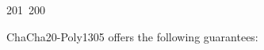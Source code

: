 201~200~\documentclass{article}
\begin{document}
	                                                                                                                                                                                                                                                                                                	                                                                                                                                        	    	                                                                                                	                                                                                                                                                                                                                                                                                                                                	                                                                        	                                                                        	                                                                                                                                        	                                                                                                                                                                                                                        	                                                                                                                            	                                                                	                                                                                                                                                                                    ChaCha20-Poly1305 offers the following guarantees:
\end{document}
